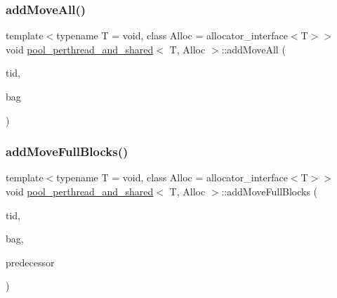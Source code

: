 \subsubsection{\texorpdfstring{add\+Move\+All()}{addMoveAll()}}
{\footnotesize\ttfamily template$<$typename T  = void, class Alloc  = allocator\+\_\+interface$<$\+T$>$$>$ \\
void \hyperlink{classpool__perthread__and__shared}{pool\+\_\+perthread\+\_\+and\+\_\+shared}$<$ T, Alloc $>$\+::add\+Move\+All (\begin{DoxyParamCaption}\item[{const int}]{tid,  }\item[{\hyperlink{classblockbag}{blockbag}$<$ T $>$ $\ast$}]{bag }\end{DoxyParamCaption})\hspace{0.3cm}{\ttfamily [inline]}}

\mbox{\label{classpool__perthread__and__shared_ae1e35a34657e432e02b4025ed9206add}} 
\subsubsection{\texorpdfstring{add\+Move\+Full\+Blocks()}{addMoveFullBlocks()}\hspace{0.1cm}{\footnotesize\ttfamily [1/2]}}
{\footnotesize\ttfamily template$<$typename T  = void, class Alloc  = allocator\+\_\+interface$<$\+T$>$$>$ \\
void \hyperlink{classpool__perthread__and__shared}{pool\+\_\+perthread\+\_\+and\+\_\+shared}$<$ T, Alloc $>$\+::add\+Move\+Full\+Blocks (\begin{DoxyParamCaption}\item[{const int}]{tid,  }\item[{\hyperlink{classblockbag}{blockbag}$<$ T $>$ $\ast$}]{bag,  }\item[{\hyperlink{classblock}{block}$<$ T $>$ $\ast$const}]{predecessor }\end{DoxyParamCaption})\hspace{0.3cm}{\ttfamily [inline]}}

\mbox{\label{classpool__perthread__and__shared_a4c7dfae20a74fd041289497cec1d00a2}} 
